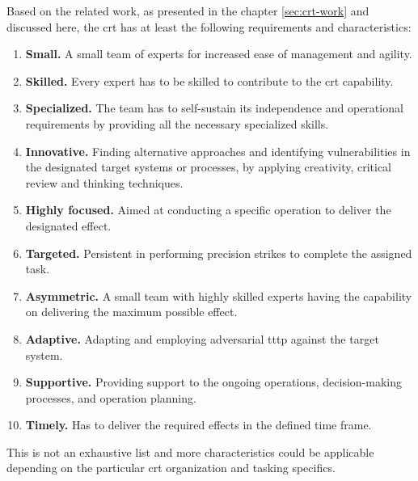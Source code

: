 Based on the related work, as presented in the chapter \ref{sec:crt-work} and discussed here, the \gls{crt} has at least the following requirements and characteristics:
\begin{enumerate}
    \item \textbf{Small.} A small team of experts for increased ease of management and agility.
    \item \textbf{Skilled.} Every expert has to be skilled to contribute to the \gls{crt} capability.
    \item \textbf{Specialized.} The team has to self-sustain its independence and operational requirements by providing all the necessary specialized skills.
    \item \textbf{Innovative.} Finding alternative approaches and identifying vulnerabilities in the designated target systems or processes, by applying creativity, critical review and thinking techniques.
    \item \textbf{Highly focused.} Aimed at conducting a specific operation to deliver the designated effect.
    \item \textbf{Targeted.} Persistent in performing precision strikes to complete the assigned task.
    \item \textbf{Asymmetric.} A small team with highly skilled experts having the capability on delivering the maximum possible effect.
    \item \textbf{Adaptive.} Adapting and employing adversarial \gls{tttp} against the target system.
    \item \textbf{Supportive.} Providing support to the ongoing operations, decision-making processes, and operation planning.
    \item \textbf{Timely.} Has to deliver the required effects in the defined time frame.
\end{enumerate}
This is not an exhaustive list and more characteristics could be applicable depending on the particular \gls{crt} organization and tasking specifics.